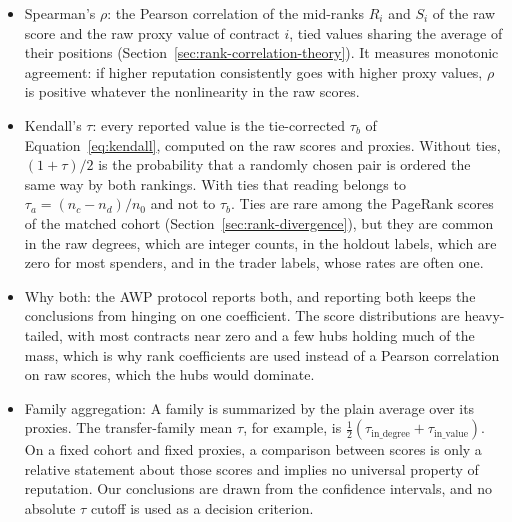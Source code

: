 \begin{itemize}
\item Spearman's $\rho$: the Pearson correlation of the mid-ranks $R_i$ and $S_i$ of the raw score and the raw proxy value of contract $i$, tied values sharing the average of their positions (Section~\ref{sec:rank-correlation-theory}). It measures monotonic agreement: if higher reputation consistently goes with higher proxy values, $\rho$ is positive whatever the nonlinearity in the raw scores.

\item Kendall's $\tau$: every reported value is the tie-corrected $\tau_b$ of Equation~\eqref{eq:kendall}, computed on the raw scores and proxies. Without ties, $(1+\tau)/2$ is the probability that a randomly chosen pair is ordered the same way by both rankings. With ties that reading belongs to $\tau_a=(n_c-n_d)/n_0$ and not to $\tau_b$. Ties are rare among the PageRank scores of the matched cohort (Section~\ref{sec:rank-divergence}), but they are common in the raw degrees, which are integer counts, in the holdout labels, which are zero for most spenders, and in the trader labels, whose rates are often one.

\item Why both: the AWP protocol \parencite{do2023awp} reports both, and reporting both keeps the conclusions from hinging on one coefficient. The score distributions are heavy-tailed, with most contracts near zero and a few hubs holding much of the mass, which is why rank coefficients are used instead of a Pearson correlation on raw scores, which the hubs would dominate.

\item Family aggregation: A family is summarized by the plain average over its proxies. The transfer-family mean $\tau$, for example, is $\tfrac{1}{2}(\tau_{\mathrm{in\_degree}}+\tau_{\mathrm{in\_value}})$. On a fixed cohort and fixed proxies, a comparison between scores is only a relative statement about those scores and implies no universal property of reputation. Our conclusions are drawn from the confidence intervals, and no absolute $\tau$ cutoff is used as a decision criterion.


\end{itemize}
